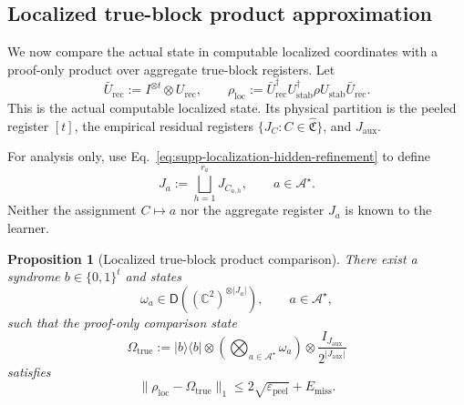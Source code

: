 \documentclass[
  aps,
  prx,
  reprint,
  superscriptaddress,
  amsmath,
  amssymb,
  nofootinbib,
  longbibliography
]{revtex4-2}
\newtheorem{proposition}[theorem]{Proposition}
\newcommand{\D}{\mathsf{D}}
\begin{document}
\subsection{Localized true-block product approximation}
\label{sec:supp-localized-true-block-product}

We now compare the actual state in computable localized coordinates with a
proof-only product over aggregate true-block registers.
Let
\begin{equation}
\bar U_{\mathrm{rec}}
:=
I^{\otimes t}\otimes U_{\mathrm{rec}},
\qquad
\rho_{\mathrm{loc}}
:=
\bar U_{\mathrm{rec}}^\dagger
U_{\mathrm{stab}}^\dagger\rho U_{\mathrm{stab}}
\bar U_{\mathrm{rec}}.
\label{eq:supp-computable-localized-state}
\end{equation}
This is the actual computable localized state.  Its physical partition is
the peeled register $[t]$, the empirical residual registers
$\{J_C:C\in\widehat{\mathfrak C}\}$, and $J_{\mathrm{aux}}$.

For analysis only, use Eq.~\eqref{eq:supp-localization-hidden-refinement}
to define
\begin{equation}
J_a
:=
\bigsqcup_{h=1}^{r_a}J_{C_{a,h}},
\qquad
a\in\mathcal A^\star.
\label{eq:supp-proof-only-hidden-register-aggregation}
\end{equation}
Neither the assignment $C\mapsto a$ nor the aggregate register $J_a$ is
known to the learner.

\begin{proposition}[Localized true-block product comparison]
\label{prop:supp-localized-true-block-product}
There exist a syndrome $b\in\{0,1\}^t$ and states
\[
\omega_a\in\D\!\left((\mathbb C^2)^{\otimes |J_a|}\right),
\qquad a\in\mathcal A^\star,
\]
such that the proof-only comparison state
\begin{equation}
\Omega_{\mathrm{true}}
:=
|b\rangle\!\langle b|
\otimes
\left(\bigotimes_{a\in\mathcal A^\star}\omega_a\right)
\otimes
\frac{I_{J_{\mathrm{aux}}}}{2^{|J_{\mathrm{aux}}|}}
\label{eq:supp-localized-true-block-model}
\end{equation}
satisfies
\begin{equation}
\|\rho_{\mathrm{loc}}-\Omega_{\mathrm{true}}\|_1
\le
2\sqrt{\varepsilon_{\mathrm{peel}}}
+
E_{\mathrm{miss}}.
\label{eq:supp-block-normalized-close-product-form}
\end{equation}
\end{proposition}
\end{document}
